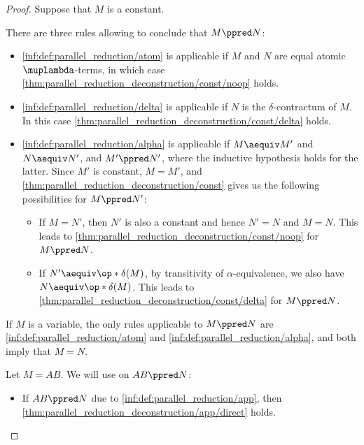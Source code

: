 \begin{proof}
   Suppose that \( M \) is a constant.

  There are three rules allowing to conclude that \( M \ppred N \):
  \begin{itemize}
    \item \ref{inf:def:parallel_reduction/atom} is applicable if \( M \) and \( N \) are equal atomic \( \muplambda \)-terms, in which case \ref{thm:parallel_reduction_deconstruction/const/noop} holds.

    \item \ref{inf:def:parallel_reduction/delta} is applicable if \( N \) is the \( \delta \)-contractum of \( M \). In this case \ref{thm:parallel_reduction_deconstruction/const/delta} holds.

    \item \ref{inf:def:parallel_reduction/alpha} is applicable if \( M \aequiv M' \) and \( N \aequiv N' \), and \( M' \ppred N' \), where the inductive hypothesis holds for the latter. Since \( M' \) is constant, \( M = M' \), and \ref{thm:parallel_reduction_deconstruction/const} gives us the following possibilities for \( M \ppred N' \):

    \begin{itemize}
      \item If \( M = N' \), then \( N' \) is also a constant and hence \( N' = N \) and \( M = N \). This leads to \ref{thm:parallel_reduction_deconstruction/const/noop} for \( M \ppred N \).

      \item If \( N' \aequiv \op*{\delta}(M) \), by transitivity of \( \alpha \)-equivalence, we also have \( N \aequiv \op*{\delta}(M) \). This leads to \ref{thm:parallel_reduction_deconstruction/const/delta} for \( M \ppred N \).
    \end{itemize}
  \end{itemize}

   If \( M \) is a variable, the only rules applicable to \( M \ppred N \) are \ref{inf:def:parallel_reduction/atom} and \ref{inf:def:parallel_reduction/alpha}, and both imply that \( M = N \).

   Let \( M = AB \). We will use  on \( AB \ppred N \):
  \begin{itemize}
    \item If \( AB \ppred N \) due to \ref{inf:def:parallel_reduction/app}, then \ref{thm:parallel_reduction_deconstruction/app/direct} holds.


\end{itemize}
\end{proof}
